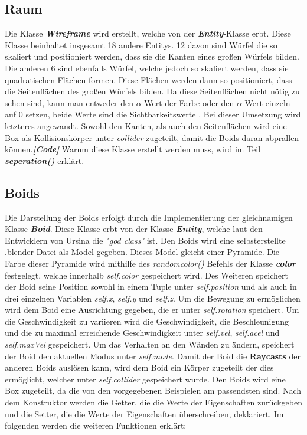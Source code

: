 \documentclass[a4paper, hidelinks, 12pt]{article}
\begin{document}
\subsection{Raum}\label{Wireframe}
Die Klasse \textbf{\emph{Wireframe}} wird erstellt, welche von der \textbf{\emph{Entity}}-Klasse\cite{2022l} erbt. Diese Klasse beinhaltet insgesamt 18 andere Entitys. 12 davon sind Würfel die so skaliert und positioniert werden, dass sie die Kanten eines großen Würfels bilden. Die anderen 6 sind ebenfalls Würfel, welche jedoch so skaliert werden, dass sie quadratischen Flächen formen. Diese Flächen werden dann so positioniert, dass die Seitenflächen des großen Würfels bilden. Da diese Seitenflächen nicht nötig zu sehen sind, kann man entweder den $\alpha$-Wert der Farbe oder den $\alpha$-Wert einzeln auf 0 setzen, beide Werte sind die Sichtbarkeitswerte \cite{2022p}. Bei dieser Umsetzung wird letzteres angewandt. Sowohl den Kanten, als auch den Seitenflächen wird eine Box als Kollisionskörper unter \emph{collider} zugeteilt, damit die Boids daran abprallen können\cite{2022r}.\hyperref[CodeRaum]{\textbf{\emph{[Code]}}} \newline \scriptsize Warum diese Klasse erstellt werden muss, wird im Teil \hyperref[sec:seperation]{\textbf{\emph{seperation()}}} erklärt. 
\normalsize\subsection{Boids}\label{sec:Boid}
Die Darstellung der Boids erfolgt durch die Implementierung der gleichnamigen Klasse \textbf{\emph{Boid}}. Diese Klasse erbt von der Klasse \textbf{\emph{Entity}}\cite{2022l}, welche laut den Entwicklern von Ursina die \emph{"god class"} ist\cite{godclass}. 
Den Boids wird eine selbsterstellte .blender-Datei als Model gegeben. Dieses Model gleicht einer Pyramide. Die Farbe dieser Pyramide wird mithilfe des \emph{random\textunderscore color()} Befehls der Klasse \textbf{\emph{color}} festgelegt, welche innerhalb \emph{self.color} gespeichert wird\cite{color}. Des Weiteren speichert der Boid seine Position sowohl in einem Tuple unter \emph{self.position} und als auch in drei einzelnen Variablen \emph{self.x}, \emph{self.y} und \emph{self.z}. Um die Bewegung zu ermöglichen wird dem Boid eine Ausrichtung gegeben, die er unter \emph{self.rotation} speichert\cite{2022l}. Um die Geschwindigkeit zu variieren wird die Geschwindigkeit, die Beschleunigung und die zu maximal erreichende Geschwindigkeit unter \emph{self.vel}, \emph{self.acel} und \emph{self.maxVel} gespeichert. Um das Verhalten an den Wänden zu ändern, speichert der Boid den aktuellen Modus unter \emph{self.mode}. Damit der Boid die \textbf{Raycasts} der anderen Boids auslösen kann, wird dem Boid ein Körper zugeteilt der dies ermöglicht, welcher unter \emph{self.collider} gespeichert wurde. Den Boids wird eine Box zugeteilt, da die von den vorgegebenen Beispielen am passendsten sind\cite{2022r}.
Nach dem Konstruktor werden die Getter, die die Werte der Eigenschaften zurückgeben und die Setter, die die Werte der Eigenschaften überschreiben, deklariert.
Im folgenden werden die weiteren Funktionen erklärt:\newline
	
\end{document}
